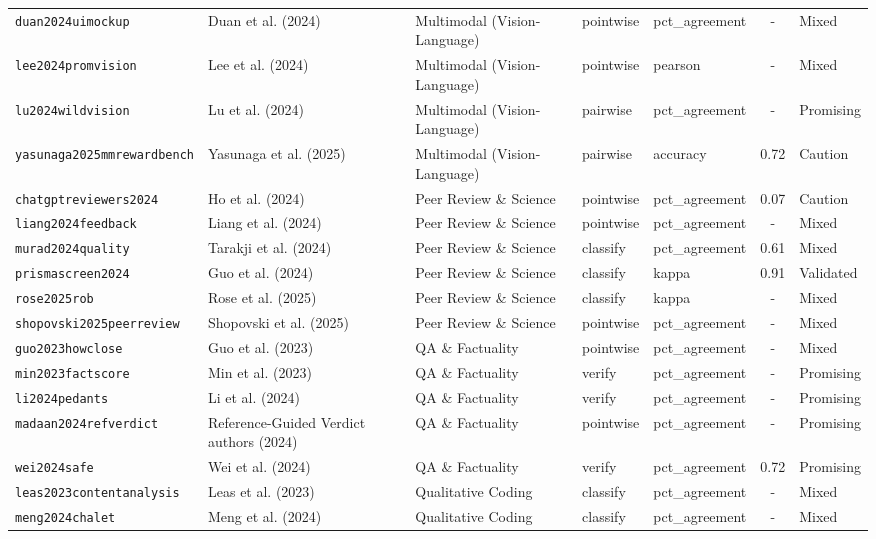 \begin{longtable}{@{}l l l l l c l@{}}
\texttt{duan2024uimockup} & Duan et al. (2024) & Multimodal (Vision-Language) & pointwise & pct\_agreement & - & Mixed \\
\texttt{lee2024promvision} & Lee et al. (2024) & Multimodal (Vision-Language) & pointwise & pearson & - & Mixed \\
\texttt{lu2024wildvision} & Lu et al. (2024) & Multimodal (Vision-Language) & pairwise & pct\_agreement & - & Promising \\
\texttt{yasunaga2025mmrewardbench} & Yasunaga et al. (2025) & Multimodal (Vision-Language) & pairwise & accuracy & 0.72 & Caution \\
\texttt{chatgptreviewers2024} & Ho et al. (2024) & Peer Review \& Science & pointwise & pct\_agreement & 0.07 & Caution \\
\texttt{liang2024feedback} & Liang et al. (2024) & Peer Review \& Science & pointwise & pct\_agreement & - & Mixed \\
\texttt{murad2024quality} & Tarakji et al. (2024) & Peer Review \& Science & classify & pct\_agreement & 0.61 & Mixed \\
\texttt{prismascreen2024} & Guo et al. (2024) & Peer Review \& Science & classify & kappa & 0.91 & Validated \\
\texttt{rose2025rob} & Rose et al. (2025) & Peer Review \& Science & classify & kappa & - & Mixed \\
\texttt{shopovski2025peerreview} & Shopovski et al. (2025) & Peer Review \& Science & pointwise & pct\_agreement & - & Mixed \\
\texttt{guo2023howclose} & Guo et al. (2023) & QA \& Factuality & pointwise & pct\_agreement & - & Mixed \\
\texttt{min2023factscore} & Min et al. (2023) & QA \& Factuality & verify & pct\_agreement & - & Promising \\
\texttt{li2024pedants} & Li et al. (2024) & QA \& Factuality & verify & pct\_agreement & - & Promising \\
\texttt{madaan2024refverdict} & Reference-Guided Verdict authors (2024) & QA \& Factuality & pointwise & pct\_agreement & - & Promising \\
\texttt{wei2024safe} & Wei et al. (2024) & QA \& Factuality & verify & pct\_agreement & 0.72 & Promising \\
\texttt{leas2023contentanalysis} & Leas et al. (2023) & Qualitative Coding & classify & pct\_agreement & - & Mixed \\
\texttt{meng2024chalet} & Meng et al. (2024) & Qualitative Coding & classify & pct\_agreement & - & Mixed \\

\end{longtable}
